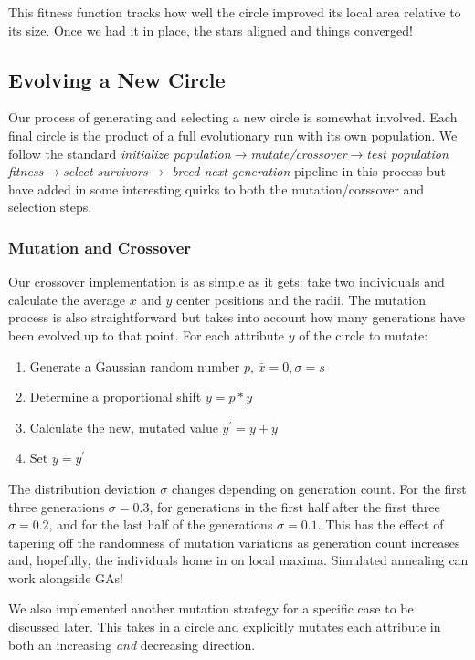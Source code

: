 \documentclass[12pt]{article}
\begin{document}
This fitness function tracks how well the circle improved its local area relative to its size. Once we had it in place, the stars aligned and things converged!

\subsection{Evolving a New Circle}
Our process of generating and selecting a new circle is somewhat involved. Each final circle is the product of a full evolutionary run with its own population. We follow the standard \textit{initialize population}$\rightarrow$\textit{mutate/crossover}$\rightarrow$\textit{test population fitness}$\rightarrow$\textit{select survivors}$\rightarrow$
\textit{breed next generation} pipeline in this process but have added in some interesting quirks to both the mutation/corssover and selection steps. 

\subsubsection{Mutation and Crossover}
Our crossover implementation is as simple as it gets: take two individuals and calculate the average $x$ and $y$ center positions and the radii. The mutation process is also straightforward but takes into account how many generations have been evolved up to that point. For each attribute $y$ of the circle to mutate:
\begin{enumerate}
\item Generate a Gaussian random number $p$, $\bar{x} = 0, \sigma = s$
\item Determine a proportional shift $\tilde{y} = p*y$
\item Calculate the new, mutated value $y^{\prime} = y + \tilde{y}$
\item Set $y = y^{\prime}$ 
\end{enumerate}
The distribution deviation $\sigma$ changes depending on generation count. For the first three generations $\sigma = 0.3$, for generations in the first half after the first three $\sigma = 0.2$, and for the last half of the generations $\sigma = 0.1$. This has the effect of tapering off the randomness of mutation variations as generation count increases and, hopefully, the individuals home in on local maxima. Simulated annealing can work alongside GAs!

We also implemented another mutation strategy for a specific case to be discussed later. This takes in a circle and explicitly mutates each attribute in both an increasing \textit{and} decreasing direction.
\end{document}
